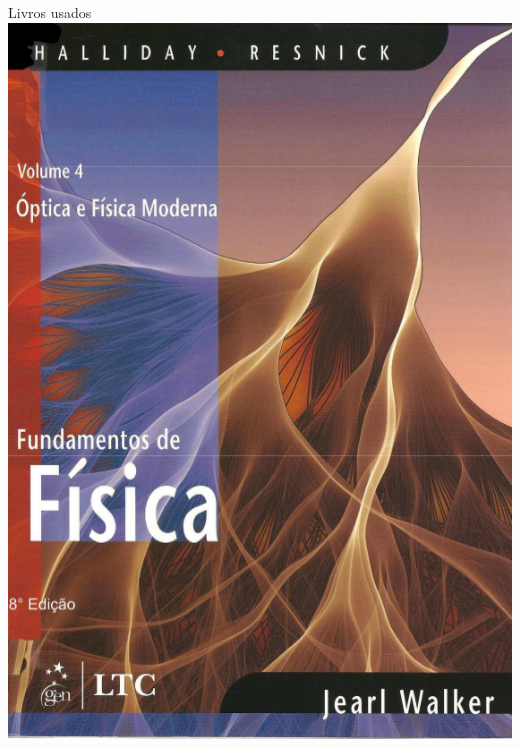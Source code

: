 \begin{frame}{Livros usados}
    \centering
    \includegraphics[height=0.75\textheight]{images/halliday4}
    \hspace{1cm}

\end{frame}
